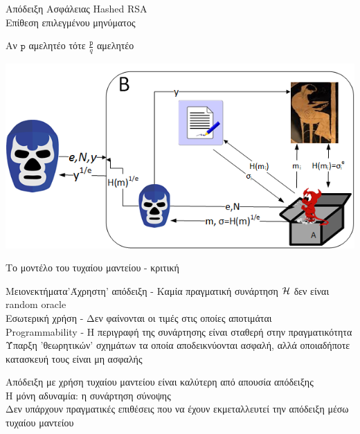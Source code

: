 \documentclass{beamer}
\begin{document}
\begin{frame}[allowframebreaks]{Απόδειξη Ασφάλειας Hashed RSA \\ Επίθεση επιλεγμένου μηνύματος}
\begin{center}
Αν $\mathrm{\mathtt{p}}$ αμελητέο τότε $\frac{\mathtt{p}}{q}$ αμελητέο
\end{center}

\framebreak

\begin{center}
\includegraphics[scale=0.7]{ro-chosenm.png}
\end{center}

\end{frame}

\begin{frame}{Το μοντέλο του τυχαίου μαντείου - κριτική}
\begin{small}
\begin{block}{\alert{Μειονεκτήματα}}'Άχρηστη' απόδειξη - Καμία πραγματική συνάρτηση $\mathcal{H}$ δεν είναι random oracle \\
\pause
Εσωτερική χρήση - Δεν φαίνονται οι τιμές στις οποίες αποτιμάται \\
\pause
Programmability - Η περιγραφή της συνάρτησης είναι σταθερή στην πραγματικότητα \\
\pause
Ύπαρξη 'θεωρητικών' σχημάτων τα οποία αποδεικνύονται ασφαλή, αλλά οποιαδήποτε κατασκευή τους είναι μη ασφαλής \\
\end{block}
\pause
\begin{block}{}
Απόδειξη με χρήση τυχαίου μαντείου είναι καλύτερη από απουσία απόδειξης \\
\pause
Η μόνη αδυναμία: η συνάρτηση σύνοψης \\
\pause
Δεν υπάρχουν πραγματικές επιθέσεις που να έχουν εκμεταλλευτεί την απόδειξη μέσω τυχαίου μαντείου
\end{block}
\end{small}
\end{frame}
\end{document}
